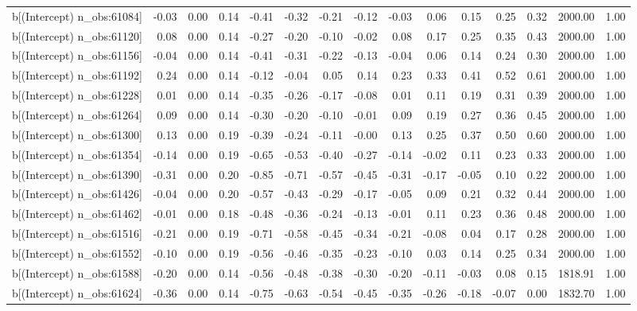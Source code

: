 \begin{table}[ht]
\begin{tabular}{rrrrrrrrrrrrrrr}
  b[(Intercept) n\_obs:61084] & -0.03 & 0.00 & 0.14 & -0.41 & -0.32 & -0.21 & -0.12 & -0.03 & 0.06 & 0.15 & 0.25 & 0.32 & 2000.00 & 1.00 \\ 
  b[(Intercept) n\_obs:61120] & 0.08 & 0.00 & 0.14 & -0.27 & -0.20 & -0.10 & -0.02 & 0.08 & 0.17 & 0.25 & 0.35 & 0.43 & 2000.00 & 1.00 \\ 
  b[(Intercept) n\_obs:61156] & -0.04 & 0.00 & 0.14 & -0.41 & -0.31 & -0.22 & -0.13 & -0.04 & 0.06 & 0.14 & 0.24 & 0.30 & 2000.00 & 1.00 \\ 
  b[(Intercept) n\_obs:61192] & 0.24 & 0.00 & 0.14 & -0.12 & -0.04 & 0.05 & 0.14 & 0.23 & 0.33 & 0.41 & 0.52 & 0.61 & 2000.00 & 1.00 \\ 
  b[(Intercept) n\_obs:61228] & 0.01 & 0.00 & 0.14 & -0.35 & -0.26 & -0.17 & -0.08 & 0.01 & 0.11 & 0.19 & 0.31 & 0.39 & 2000.00 & 1.00 \\ 
  b[(Intercept) n\_obs:61264] & 0.09 & 0.00 & 0.14 & -0.30 & -0.20 & -0.10 & -0.01 & 0.09 & 0.19 & 0.27 & 0.36 & 0.45 & 2000.00 & 1.00 \\ 
  b[(Intercept) n\_obs:61300] & 0.13 & 0.00 & 0.19 & -0.39 & -0.24 & -0.11 & -0.00 & 0.13 & 0.25 & 0.37 & 0.50 & 0.60 & 2000.00 & 1.00 \\ 
  b[(Intercept) n\_obs:61354] & -0.14 & 0.00 & 0.19 & -0.65 & -0.53 & -0.40 & -0.27 & -0.14 & -0.02 & 0.11 & 0.23 & 0.33 & 2000.00 & 1.00 \\ 
  b[(Intercept) n\_obs:61390] & -0.31 & 0.00 & 0.20 & -0.85 & -0.71 & -0.57 & -0.45 & -0.31 & -0.17 & -0.05 & 0.10 & 0.22 & 2000.00 & 1.00 \\ 
  b[(Intercept) n\_obs:61426] & -0.04 & 0.00 & 0.20 & -0.57 & -0.43 & -0.29 & -0.17 & -0.05 & 0.09 & 0.21 & 0.32 & 0.44 & 2000.00 & 1.00 \\ 
  b[(Intercept) n\_obs:61462] & -0.01 & 0.00 & 0.18 & -0.48 & -0.36 & -0.24 & -0.13 & -0.01 & 0.11 & 0.23 & 0.36 & 0.48 & 2000.00 & 1.00 \\ 
  b[(Intercept) n\_obs:61516] & -0.21 & 0.00 & 0.19 & -0.71 & -0.58 & -0.45 & -0.34 & -0.21 & -0.08 & 0.04 & 0.17 & 0.28 & 2000.00 & 1.00 \\ 
  b[(Intercept) n\_obs:61552] & -0.10 & 0.00 & 0.19 & -0.56 & -0.46 & -0.35 & -0.23 & -0.10 & 0.03 & 0.14 & 0.25 & 0.34 & 2000.00 & 1.00 \\ 
  b[(Intercept) n\_obs:61588] & -0.20 & 0.00 & 0.14 & -0.56 & -0.48 & -0.38 & -0.30 & -0.20 & -0.11 & -0.03 & 0.08 & 0.15 & 1818.91 & 1.00 \\ 
  b[(Intercept) n\_obs:61624] & -0.36 & 0.00 & 0.14 & -0.75 & -0.63 & -0.54 & -0.45 & -0.35 & -0.26 & -0.18 & -0.07 & 0.00 & 1832.70 & 1.00 \\ 

\end{tabular}
\end{table}
